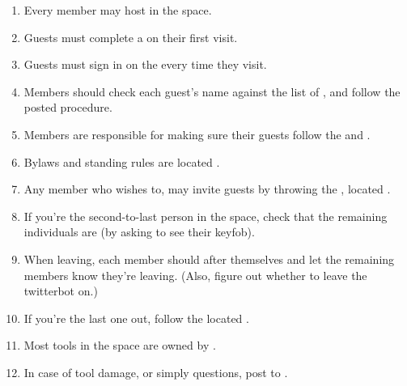 \documentclass[10pt,letterpaper]{article}
\begin{document}
\small
    \begin{Form}
        \begin{enumerate}
            \item Every member may host \TextField[name=11,width=2.5cm,bordercolor=black]{\mbox{}} in the space.
            \item Guests must complete a \TextField[name=21,width=2.5cm,bordercolor=black]{\mbox{}} on their first visit.
            \item Guests must sign in on the \TextField[name=31,width=2.5cm,bordercolor=black]{\mbox{}} every time they visit.
            \item Members should check each guest's name against the list of \TextField[name=41,width=2.5cm,bordercolor=black]{\mbox{}} \TextField[name=42,width=2.5cm,bordercolor=black]{\mbox{}}, and follow the posted procedure.
            \item Members are responsible for making sure their guests follow the \TextField[name=51,width=2.5cm,bordercolor=black]{\mbox{}} and \TextField[name=52,width=2.5cm,bordercolor=black]{\mbox{}}.
            \item Bylaws and standing rules are located \TextField[name=61,width=2.5cm,bordercolor=black]{\mbox{}} \TextField[name=62,width=2.5cm,bordercolor=black]{\mbox{}} \TextField[name=63,width=2.5cm,bordercolor=black]{\mbox{}}.
            \item Any member who wishes to, may invite guests by throwing the \TextField[name=71,width=2.5cm,bordercolor=black]{\mbox{}}, located \TextField[name=72,width=2.5cm,bordercolor=black]{\mbox{}}.
            \item If you're the second-to-last person in the space, check that the remaining individuals are \TextField[name=81,width=2.5cm,bordercolor=black]{\mbox{}} (by asking to see their keyfob).
            \item When leaving, each member should \TextField[name=91,width=2.5cm,bordercolor=black]{\mbox{}} \TextField[name=92,width=2.5cm,bordercolor=black]{\mbox{}} after themselves and let the remaining members know they're leaving. (Also, figure out whether to leave the twitterbot on.)
            \item If you're the last one out, follow the \TextField[name=A1,width=2.5cm,bordercolor=black]{\mbox{}} located \TextField[name=A2,width=2.5cm,bordercolor=black]{\mbox{}}.
            \item Most tools in the space are owned by \TextField[name=B1,width=2.5cm,bordercolor=black]{\mbox{}}.
            \item In case of tool damage, or simply questions, post to \TextField[name=C1,width=2.5cm,bordercolor=black]{\mbox{}}.

\end{enumerate}
\end{Form}
\end{document}
